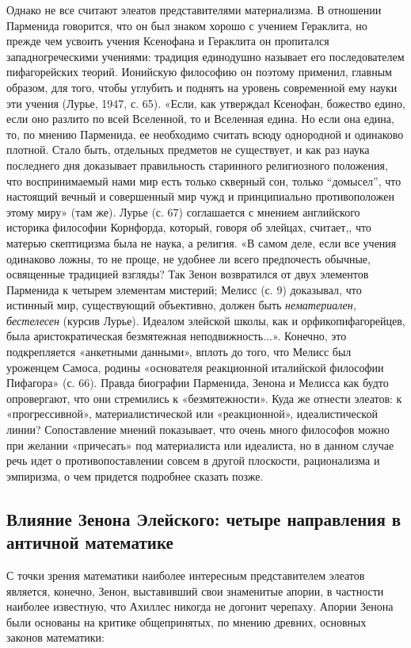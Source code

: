 Однако не все считают элеатов представителями материализма. В
отношении Парменида говорится, что он был знаком хорошо с учением
Гераклита, но прежде чем усвоить учения Ксенофана и Гераклита он
пропитался западногреческими учениями: традиция единодушно называет
его последователем пифагорейских теорий. Ионийскую философию он
поэтому применил, главным образом, для того, чтобы углубить и поднять
на уровень современной ему науки эти учения (Лурье, 1947, с. 65).
«Если, как утверждал Ксенофан, божество едино, если оно разлито по
всей Вселенной, то и Вселенная едина. Но если она едина, то, по мнению
Парменида, ее необходимо считать всюду однородной и одинаково плотной.
Стало быть, отдельных предметов не существует, и как раз наука
последнего дня доказывает правильность старинного религиозного
положения, что воспринимаемый нами мир есть только скверный сон,
только ``домысел'', что настоящий вечный и совершенный мир чужд и
принципиально противоположен этому миру» (там же). Лурье (с. 67)
соглашается с мнением английского историка философии Корнфорда,
который, говоря об элейцах, считает,, что матерью скептицизма была не
наука, а религия. «В самом деле, если все учения одинаково ложны, то
не проще, не удобнее ли всего предпочесть обычные, освященные
традицией взгляды? Так Зенон возвратился от двух элементов Парменида к
четырем элементам мистерий; Мелисс (с. 9) доказывал, что истинный мир,
существующий объективно, должен быть \emph{нематериален, бестелесен}
(курсив Лурье). Идеалом элейской школы, как и орфикопифагорейцев, была
аристократическая безмятежная неподвижность...». Конечно, это
подкрепляется «анкетными данными», вплоть до того, что Мелисс был
уроженцем Самоса, родины «основателя реакционной италийской философии
Пифагора» (с. 66). Правда биографии Парменида, Зенона и Мелисса как
будто опровергают, что они стремились к «безмятежности». Куда же
отнести элеатов: к «прогрессивной», материалистической или
«реакционной», идеалистической линии? Сопоставление мнений показывает,
что очень много философов можно при желании «причесать» под
материалиста или идеалиста, но в данном случае речь идет о
противопоставлении совсем в другой плоскости, рационализма и
эмпиризма, о чем придется подробнее сказать позже.

\subsection{Влияние Зенона Элейского: четыре направления в античной
математике}

С точки зрения математики наиболее интересным представителем
элеатов является, конечно, Зенон, выставивший свои знаменитые апории,
в частности наиболее известную, что Ахиллес никогда не догонит
черепаху. Апории Зенона были основаны на критике общепринятых, по
мнению древних, основных законов математики:

